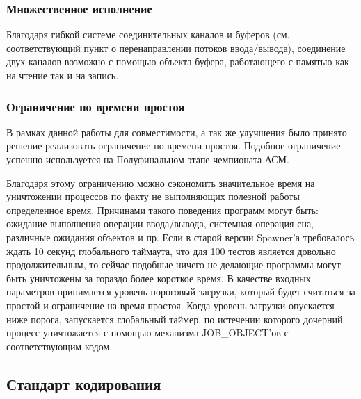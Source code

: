 \documentclass{imcs}
\begin{document}
\subsubsection{Множественное исполнение}
Благодаря гибкой системе соединительных каналов и буферов (см. соответствующий пункт о перенаправлении потоков ввода/вывода), соединение двух каналов возможно с помощью объекта буфера, работающего с памятью как на чтение так и на запись.

\subsubsection{Ограничение по времени простоя}
В рамках данной работы для совместимости, а так же улучшения было принято решение реализовать ограничение по времени простоя. Подобное ограничение успешно используется на Полуфинальном этапе чемпионата АСМ\cite{pcms2}.

Благодаря  этому ограничению можно сэкономить значительное время на уничтожении процессов по факту не выполняющих полезной работы определенное время. Причинами такого поведения программ могут быть: ожидание выполнения операции ввода/вывода, системная операция сна, различные ожидания объектов и пр. Если в старой версии Spawner'а требовалось ждать 10 секунд глобального таймаута, что для 100 тестов является довольно продолжительным, то сейчас подобные ничего не делающие программы могут быть уничтожены за гораздо более короткое время. 
В качестве входных параметров принимается уровень пороговый загрузки, который будет считаться за простой и ограничение на время простоя. Когда уровень загрузки опускается ниже порога, запускается глобальный таймер, по истечении которого дочерний процесс уничтожается с помощью механизма JOB\_OBJECT'ов с соответствующим кодом.


\subsection{Стандарт кодирования}
\end{document}
